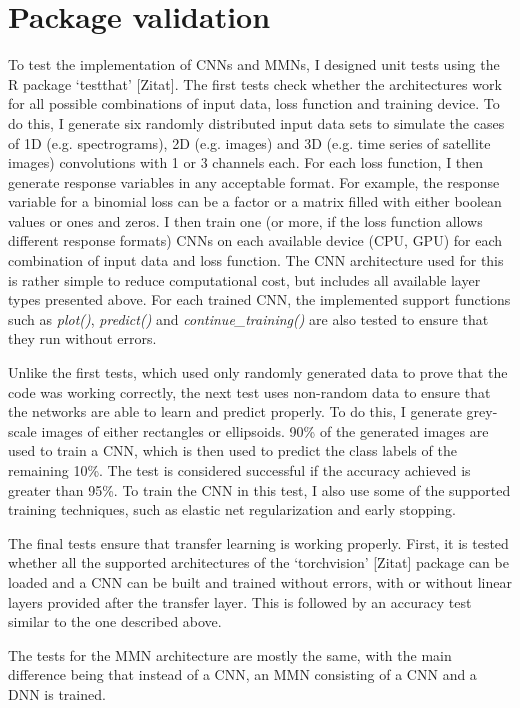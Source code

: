 \documentclass[12pt,twoside]{scrreport}
\newcommand{\pkg}[1]{`#1'}
\newcommand{\fn}[2][]{\textit{#2(}#1\textit{)}}
\begin{document}
\section*{Package validation}
To test the implementation of CNNs and MMNs, I designed unit tests using the R package \pkg{testthat} [Zitat]. The first tests check whether the architectures work for all possible combinations of input data, loss function and training device. To do this, I generate six randomly distributed input data sets to simulate the cases of 1D (e.g. spectrograms), 2D (e.g. images) and 3D (e.g. time series of satellite images) convolutions with 1 or 3 channels each. For each loss function, I then generate response variables in any acceptable format. For example, the response variable for a binomial loss can be a factor or a matrix filled with either boolean values or ones and zeros. I then train one (or more, if the loss function allows different response formats) CNNs on each available device (CPU, GPU) for each combination of input data and loss function. The CNN architecture used for this is rather simple to reduce computational cost, but includes all available layer types presented above. For each trained CNN, the implemented support functions such as \fn{plot}, \fn{predict} and \fn{continue\_training} are also tested to ensure that they run without errors.

Unlike the first tests, which used only randomly generated data to prove that the code was working correctly, the next test uses non-random data to ensure that the networks are able to learn and predict properly. To do this, I generate grey-scale images of either rectangles or ellipsoids. 90\% of the generated images are used to train a CNN, which is then used to predict the class labels of the remaining 10\%. The test is considered successful if the accuracy achieved is greater than 95\%. To train the CNN in this test, I also use some of the supported training techniques, such as elastic net regularization and early stopping.

The final tests ensure that transfer learning is working properly. First, it is tested whether all the supported architectures of the \pkg{torchvision} [Zitat] package can be loaded and a CNN can be built and trained without errors, with or without linear layers provided after the transfer layer. This is followed by an accuracy test similar to the one described above.

The tests for the MMN architecture are mostly the same, with the main difference being that instead of a CNN, an MMN consisting of a CNN and a DNN is trained.
\end{document}
